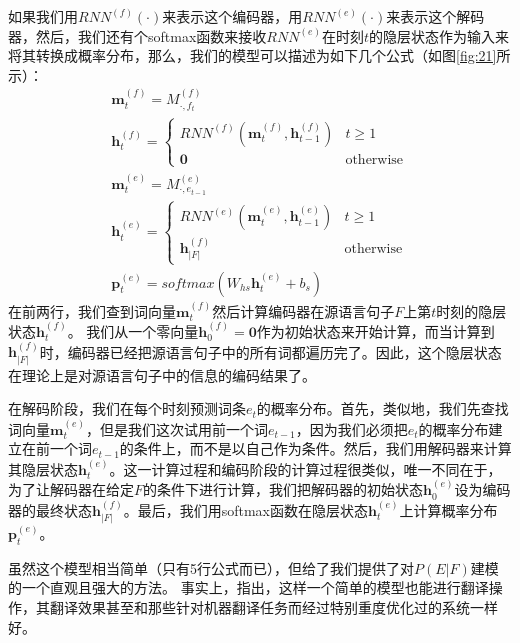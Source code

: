 \documentclass[10pt,a4paper]{ctexart}
\begin{document}
如果我们用$RNN^{(f)}(\cdot)$来表示这个编码器，用$RNN^{(e)}(\cdot)$来表示这个解码器，然后，我们还有个softmax函数来接收$RNN^{(e)}$在时刻$t$的隐层状态作为输入来将其转换成概率分布，那么，我们的模型可以描述为如下几个公式（如图\ref{fig:21}所示）：
\[
 \begin{array}{l}
   \textbf{m}_t^{(f)} = M_{\cdot,f_t}^{(f)} \\
   \textbf{h}_t^{(f)} = \left\{ \begin{array}{ll}
      RNN^{(f)}(\textbf{m}_t^{(f)},\textbf{h}_{t-1}^{(f)}) & t \geq 1 \\
      \textbf{0} & \textrm{otherwise}
      \end{array} \right. \\
   \textbf{m}_t^{(e)} = M_{\cdot,e_{t-1}}^{(e)} \\
   \textbf{h}_t^{(e)} = \left\{ \begin{array}{ll}
      RNN^{(e)}(\textbf{m}_t^{(e)},\textbf{h}_{t-1}^{(e)}) & t \geq 1 \\
      \textbf{h}_{|F|}^{(f)} & \textrm{otherwise}
      \end{array} \right. \\
   \textbf{p}_t^{(e)} = softmax(W_{hs}\textbf{h}_t^{(e)} + b_s)
 \end{array}
\]
在前两行，我们查到词向量$\textbf{m}_t^{(f)}$然后计算编码器在源语言句子$F$上第$t$时刻的隐层状态$\textbf{h}_t^{(f)}$。
我们从一个零向量$\textbf{h}_0^{(f)}=\textbf{0}$作为初始状态来开始计算，而当计算到$\textbf{h}_{|F|}^{(f)}$时，编码器已经把源语言句子中的所有词都遍历完了。因此，这个隐层状态在理论上是对源语言句子中的信息的编码结果了。

在解码阶段，我们在每个时刻预测词条$e_t$的概率分布。首先，类似地，我们先查找词向量$\textbf{m}_t^{(e)}$，但是我们这次试用前一个词$e_{t-1}$，因为我们必须把$e_t$的概率分布建立在前一个词$e_{t-1}$的条件上，而不是以自己作为条件。然后，我们用解码器来计算其隐层状态$\textbf{h}_t^{(e)}$。这一计算过程和编码阶段的计算过程很类似，唯一不同在于，为了让解码器在给定$F$的条件下进行计算，我们把解码器的初始状态$\textbf{h}_0^{(e)}$设为编码器的最终状态$\textbf{h}_{|F|}^{(f)}$。最后，我们用softmax函数在隐层状态$\textbf{h}_t^{(e)}$上计算概率分布$\textbf{p}_t^{(e)}$。

虽然这个模型相当简单（只有5行公式而已），但给了我们提供了对$P(E|F)$建模的一个直观且强大的方法。
事实上，\cite{sutskever2014sequence}指出，这样一个简单的模型也能进行翻译操作，其翻译效果甚至和那些针对机器翻译任务而经过特别重度优化过的系统一样好。
\end{document}
